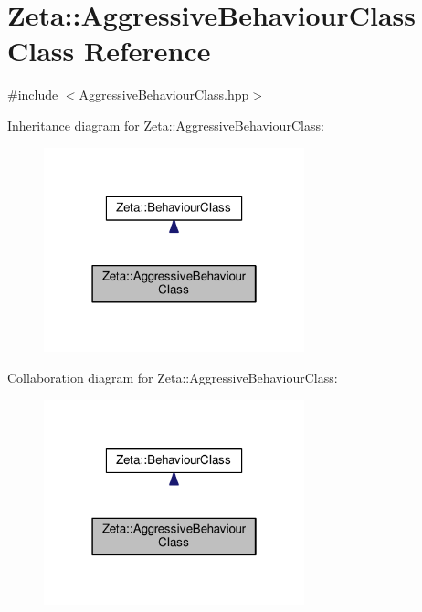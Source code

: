 \hypertarget{classZeta_1_1AggressiveBehaviourClass}{\section{Zeta\+:\+:Aggressive\+Behaviour\+Class Class Reference}
\label{classZeta_1_1AggressiveBehaviourClass}
}


{\ttfamily \#include $<$Aggressive\+Behaviour\+Class.\+hpp$>$}



Inheritance diagram for Zeta\+:\+:Aggressive\+Behaviour\+Class\+:\nopagebreak
\begin{figure}[H]
\begin{center}
\leavevmode
\includegraphics[width=214pt]{classZeta_1_1AggressiveBehaviourClass__inherit__graph}
\end{center}
\end{figure}


Collaboration diagram for Zeta\+:\+:Aggressive\+Behaviour\+Class\+:\nopagebreak
\begin{figure}[H]
\begin{center}
\leavevmode
\includegraphics[width=214pt]{classZeta_1_1AggressiveBehaviourClass__coll__graph}
\end{center}
\end{figure}
